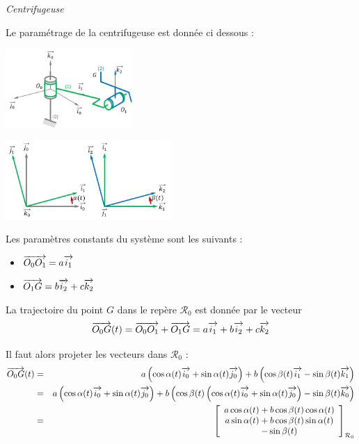 \documentclass[10pt,oneside]{article}
\begin{document}
\begin{exemple}
\textit{Centrifugeuse}

Le paramétrage de la centrifugeuse est donnée ci dessous : 

\begin{minipage}[c]{.25\linewidth}
\begin{center}
\includegraphics[height=3cm]{png/centrifugeuse_2}
\end{center}
\end{minipage}\hfill
\begin{minipage}[c]{.45\linewidth}
\begin{center}
\includegraphics[height=3cm]{png/centrifugeuse_3}
\end{center}
\end{minipage}\hfill
\begin{minipage}[c]{.25\linewidth}
Les paramètres constants du système sont les suivants : 
\begin{itemize}%
\item $\overrightarrow{O_0O_1} = a \overrightarrow{i_1}$
\item $\overrightarrow{O_1G} = b \overrightarrow{i_2} + c \overrightarrow{k_2}$
\end{itemize}
\end{minipage}

La trajectoire du point $G$ dans le repère $\mathcal{R}_0$  est donnée par le vecteur 
$$
\overrightarrow{O_0 G}(t)  = \overrightarrow{O_0O_1} + \overrightarrow{O_1G}
= a \overrightarrow{i_1} +  b \overrightarrow{i_2} + c \overrightarrow{k_2}
$$

Il faut alors projeter les vecteurs dans $\mathcal{R}_0$ : 
\begin{eqnarray*}
\overrightarrow{O_0 G}(t) &=& a \left(\cos\alpha(t) \overrightarrow{i_0} + \sin\alpha(t) \overrightarrow{j_0} \right) 
+ b \left(\cos\beta(t) \overrightarrow{i_1} - \sin\beta(t) \overrightarrow{k_1} \right) \\
&=& a \left(\cos\alpha(t) \overrightarrow{i_0} + \sin\alpha(t) \overrightarrow{j_0} \right) 
+ b \left(\cos\beta(t) \left(\cos\alpha(t) \overrightarrow{i_0} + \sin\alpha(t) \overrightarrow{j_0} \right) - \sin\beta(t) \overrightarrow{k_0} \right) \\
&=& \left[ \begin{array}{c} 
a \cos\alpha(t) + b \cos\beta(t) \cos\alpha(t) \\
a \sin\alpha(t) + b \cos\beta(t) \sin\alpha(t) \\
- \sin\beta(t)
\end{array}\right]_{\mathcal{R}_0}
\end{eqnarray*}


\end{exemple}
\end{document}
